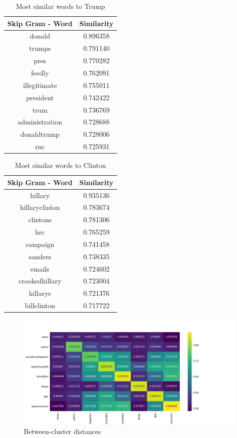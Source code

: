 \documentclass[12pt, authoryear]{elsarticle}
\begin{document}
\begin{center}
\begin{table}[H]
\begin{tabular}{ c c } 
Skip Gram - Word   &  Similarity \\
 \hline
donald   &  0.896358\\
trumps   &  0.791140\\
pres   &  0.770282\\
feedly   &  0.762091\\
illegitimate  &   0.755011\\
president   &  0.742422\\
trum   &  0.736769\\
administration  &   0.728688\\
donaldtrump   &  0.728006\\
rnc   &  0.725931\\
 \hline
\end{tabular}
\caption{Most similar words to Trump}
\label{table:5}
\end{table}
\end{center}


\begin{center}
\begin{table}[H]
\begin{tabular}{ c c } 
Skip Gram - Word   &  Similarity \\
 \hline
hillary   &  0.935136\\
hillaryclinton   &  0.783674\\
clintons &    0.781306\\
hrc   &  0.765259\\
campaign  &   0.741458\\
sanders  &  0.738335\\
emails   &  0.724602\\
crookedhillary    & 0.723004\\
hillarys   &  0.721376\\
billclinton  &   0.717722\\
 \hline
\end{tabular}
\caption{Most similar words to Clinton}
\label{table:6}
\end{table}
\end{center}

\begin{figure}[t]
\includegraphics[width=7in]{heatmap_cluster_similarity}
\centering
\caption{Between-cluster distances}
\label{distance:1}
\end{figure}
\end{document}
